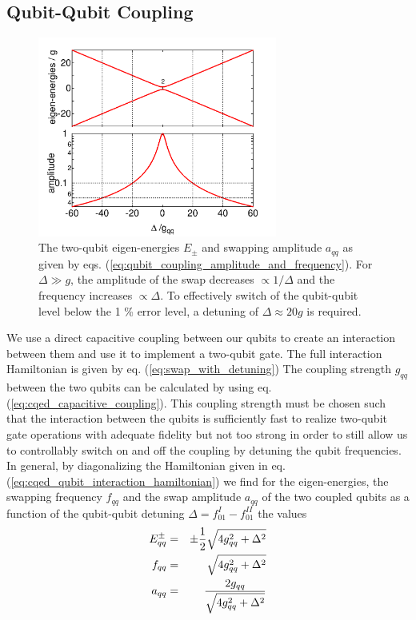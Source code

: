 \subsection{Qubit-Qubit Coupling}

\begin{figure}
	\centering
	\includegraphics[width=0.7\textwidth]{./material/mathematica/qubit_qubit_coupling}
	\caption[]{The two-qubit eigen-energies $E_\pm$ and swapping amplitude $a_{qq}$ as given by eqs. (\ref{eq:qubit_coupling_amplitude_and_frequency}). For $\Delta \gg g$, the amplitude of the swap decreases $\propto 1/\Delta$ and the frequency increases $\propto \Delta$. To effectively switch of the qubit-qubit level below the 1 \% error level, a detuning of $\Delta \approx 20 g$ is required.}
	\label{fig:qubit_coupling_amplitude_and_frequency}
\end{figure}

We use a direct capacitive coupling between our qubits to create an interaction between them and use it to implement a two-qubit gate. The full interaction Hamiltonian is given by eq. (\ref{eq:swap_with_detuning}) The coupling strength $g_{qq}$ between the two qubits can be calculated by using eq. (\ref{eq:cqed_capacitive_coupling}). This coupling strength must be chosen such that the interaction between the qubits is sufficiently fast to realize two-qubit gate operations with adequate fidelity but not too strong in order to still allow us to controllably switch on and off the coupling by detuning the qubit frequencies. In general, by diagonalizing the Hamiltonian given in eq. (\ref{eq:cqed_qubit_interaction_hamiltonian}) we find for the eigen-energies, the swapping frequency $f_{qq}$ and the swap amplitude $a_{qq}$ of the two coupled qubits as a function of the qubit-qubit detuning $\Delta=f_{01}^I-f_{01}^{II}$ the values
%
\begin{eqnarray}
E_{qq}^\pm & = & \pm\frac{1}{2}\sqrt{4g_{qq}^2+\Delta^2} \notag \\
f_{qq}     & = & \sqrt{4g_{qq}^2+\Delta^2} \notag \\
a_{qq}     & = & \frac{2g_{qq}}{\sqrt{4g_{qq}^2+\Delta^2}} \label{eq:qubit_coupling_amplitude_and_frequency}
\end{eqnarray}
%

